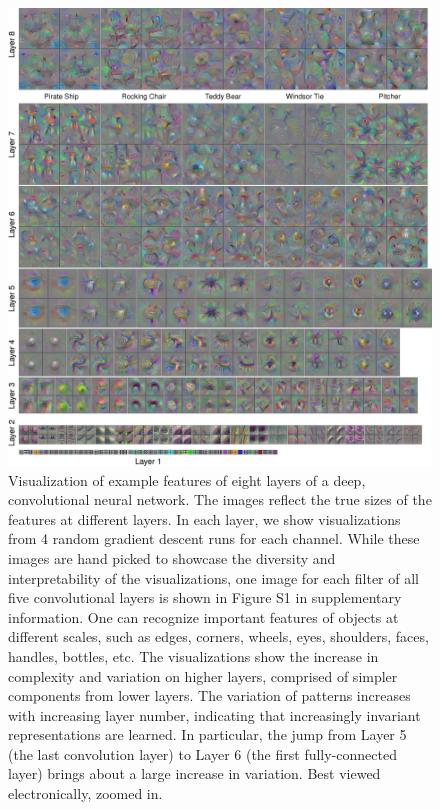 \documentclass{article}
\begin{document}
\begin{figure}[!ht]
\vskip 0.2in
\begin{center}
\centerline{\includegraphics[width=1\linewidth]{all_layers.jpg}}
\caption{Visualization of example features of eight layers of a deep, convolutional neural network. The images reflect the true sizes of the features at different layers. In each layer, we show visualizations from 4 random gradient descent runs for each channel. While these images are hand picked to showcase the diversity and interpretability of the visualizations, one image for each filter of all five convolutional layers is shown in Figure S1 in supplementary information. One can recognize important features of objects at different scales, such as edges, corners, wheels, eyes, shoulders, faces, handles, bottles, etc. The visualizations show the increase in complexity and variation on higher layers, comprised of simpler components from lower layers. The variation of patterns increases with increasing layer number, indicating that increasingly invariant representations are learned. In particular, the jump from Layer 5 (the last convolution layer) to Layer 6 (the first fully-connected layer) brings about a large increase in variation. Best viewed electronically, zoomed in.
}
\end{center}
\vskip -0.2in
\end{figure}
\end{document}
